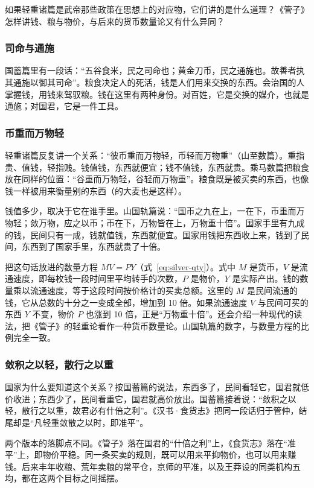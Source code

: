 如果轻重诸篇是武帝那些政策在思想上的对应物，它们讲的是什么道理？《管子》怎样讲钱、粮与物价，与后来的货币数量论又有什么异同？

\subsubsection{司命与通施}
国蓄篇里有一段话：“五谷食米，民之司命也；黄金刀币，民之通施也。故善者执其通施以御其司命”\cite{guanzi}。粮食决定人的死活，钱是人们用来交换的东西。会治国的人掌握钱，用钱来驾驭粮。钱在这里有两种身份。对百姓，它是交换的媒介，也就是通施；对国君，它是一件工具。

\subsubsection{币重而万物轻}
轻重诸篇反复讲一个关系：“彼币重而万物轻，币轻而万物重”（山至数篇）\cite{guanzi}。重指贵、值钱，轻指贱。钱值钱，东西就便宜；钱不值钱，东西就贵。乘马数篇把粮食放在同样的位置：“谷重而万物轻，谷轻而万物重”\cite{guanzi}。粮食既是被买卖的东西，也像钱一样被用来衡量别的东西（的大麦也是这样）。

钱值多少，取决于它在谁手里。山国轨篇说：“国币之九在上，一在下，币重而万物轻；敛万物，应之以币；币在下，万物皆在上，万物重十倍”\cite{guanzi}。国家手里有九成的钱，民间只有一成，钱就值钱，东西就便宜。国家用钱把东西收上来，钱到了民间，东西到了国家手里，东西就贵了十倍。

把这句话放进的数量方程 $MV=PY$（式~\eqref{eq:silver-qty}）。式中 $M$ 是货币，$V$ 是流通速度，即每枚钱一段时间里平均转手的次数，$P$ 是物价，$Y$ 是实际产出。钱的数量乘以流通速度，等于这段时间按价格计的买卖总额。这里的 $M$ 是民间流通的钱，它从总数的十分之一变成全部，增加到 10 倍。如果流通速度 $V$ 与民间可买的东西 $Y$ 不变，物价 $P$ 也涨到 10 倍，正是“万物重十倍”。还会介绍一种现代的读法，把《管子》的轻重论看作一种货币数量论。山国轨篇的数字，与数量方程的比例完全一致。

\subsubsection{敛积之以轻，散行之以重}
国家为什么要知道这个关系？按国蓄篇的说法，东西多了，民间看轻它，国君就低价收进；东西少了，民间看重它，国君就高价放出。国蓄篇接着说：“敛积之以轻，散行之以重，故君必有什倍之利”\cite{guanzi}。《汉书·食货志》把同一段话归于管仲，结尾却是“凡轻重敛散之以时，即准平”\cite{hanshu}。

两个版本的落脚点不同。《管子》落在国君的“什倍之利”上，《食货志》落在“准平”上，即物价平稳。同一条买卖的规则，既可以用来平抑物价，也可以用来赚钱。后来丰年收粮、荒年卖粮的常平仓，京师的平准，以及王莽设的同类机构五均，都在这两个目标之间摇摆。

